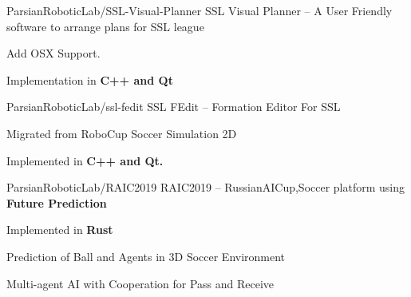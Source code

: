 
\begin{cventries}
  \cventry
    {ParsianRoboticLab/SSL-Visual-Planner} %
    {SSL Visual Planner -- A User Friendly software to arrange plans for SSL league} %
    {} %
    {} %
    {
      \begin{cvitems} %
        \item {Add OSX Support.}
        \item {Implementation in \textbf{C++ and Qt}}
      \end{cvitems}
    }

  \cventry
    {ParsianRoboticLab/ssl-fedit} %
    {SSL FEdit -- Formation Editor For SSL} %
    {} %
    {} %
    {
      \begin{cvitems} %
        \item {Migrated from RoboCup Soccer Simulation 2D}
        \item {Implemented in \textbf{C++ and Qt.}}
      \end{cvitems}
    }

  \cventry
    {ParsianRoboticLab/RAIC2019} %
    {RAIC2019 -- RussianAICup,Soccer platform using \textbf{Future Prediction}} %
    {} %
    {} %
    {
      \begin{cvitems} %
        \item {Implemented in \textbf{Rust}}
        \item {Prediction of Ball and Agents in 3D Soccer Environment}
        \item {Multi-agent AI with Cooperation for Pass and Receive}
      \end{cvitems}
    }

    

\end{cventries}
